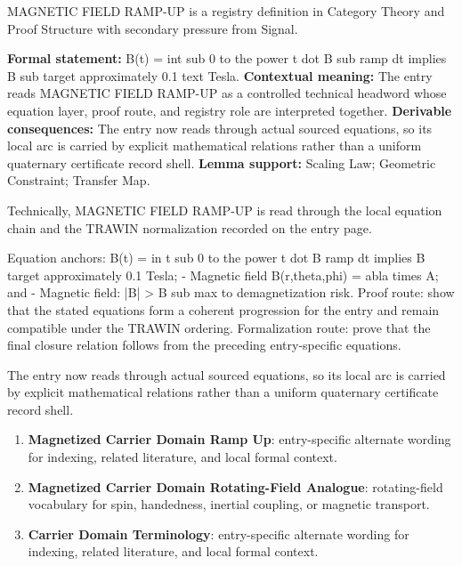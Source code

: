 
\begingroup\small
{}
MAGNETIC FIELD RAMP-UP is a registry definition in Category Theory and Proof Structure with secondary pressure from Signal.

\begingroup\footnotesize\setlength{\emergencystretch}{3em}\sloppy
\textbf{Formal statement:} B(t) = int sub 0 to the power t dot B sub ramp dt implies B sub target approximately 0.1 text Tesla. \textbf{Contextual meaning:} The entry reads MAGNETIC FIELD RAMP-UP as a controlled technical headword whose equation layer, proof route, and registry role are interpreted together. \textbf{Derivable consequences:} The entry now reads through actual sourced equations, so its local arc is carried by explicit mathematical relations rather than a uniform quaternary certificate record shell. \textbf{Lemma support:} Scaling Law; Geometric Constraint; Transfer Map.\par
\endgroup

Technically, MAGNETIC FIELD RAMP-UP is read through the local equation chain and the TRAWIN normalization recorded on the entry page.

Equation anchors: B(t) = in t sub 0 to the power t dot B ramp dt implies B target approximately 0.1 Tesla; - Magnetic field B(r,theta,phi) = abla times A; and - Magnetic field: |B| > B sub max to demagnetization risk. Proof route: show that the stated equations form a coherent progression for the entry and remain compatible under the TRAWIN ordering. Formalization route: prove that the final closure relation follows from the preceding entry-specific equations.

The entry now reads through actual sourced equations, so its local arc is carried by explicit mathematical relations rather than a uniform quaternary certificate record shell.
\endgroup

\begin{enumerate}[leftmargin=1.6em,itemsep=6pt,topsep=4pt]
\item \textbf{Magnetized Carrier Domain Ramp Up}: entry-specific alternate wording for indexing, related literature, and local formal context.
\item \textbf{Magnetized Carrier Domain Rotating-Field Analogue}: rotating-field vocabulary for spin, handedness, inertial coupling, or magnetic transport.
\item \textbf{Carrier Domain Terminology}: entry-specific alternate wording for indexing, related literature, and local formal context.
\end{enumerate}

